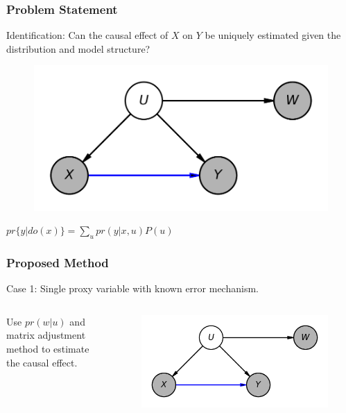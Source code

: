 \documentclass{beamer}
\begin{document}
\begin{frame}
\frametitle{Problem Statement}

\begin{center}
Identification: Can the causal effect of $ X $ on $ Y $ be uniquely estimated given the distribution and model structure?
\end{center}

\begin{figure}
    \centering
    \includegraphics[scale=0.5]{scripts/single_proxy.png}
    \label{fig:non_iden}
\end{figure}

\begin{center}
	$ pr\{y | do(x)\} = \sum_{u} pr(y | x, u) P(u) $ 
\end{center}
\end{frame}

\begin{frame}
\frametitle{Proposed Method}

Case 1: Single proxy variable with known error mechanism.
\begin{columns}

	Use $ pr(w|u) $ and matrix adjustment method to estimate the causal effect.



    \begin{figure}
    	\centering
    	\includegraphics[scale=0.5]{scripts/single_proxy.png}
    \end{figure}

\end{columns}

\end{frame}
\end{document}
